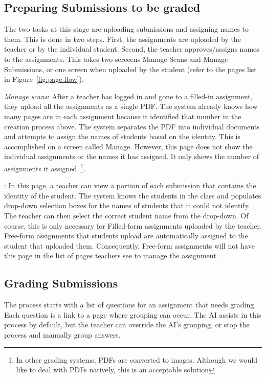 \documentclass[ms,twoside,print]{nuthesis}
\begin{document}
\subsection{Preparing Submissions to be graded}

The two tasks at this stage are uploading submissions and assigning names to them. This is done in two steps. First, the assignments are uploaded by the teacher or by the individual student. Second, the teacher approves/assigns names to the assignments. This takes two screeens Manage Scans and Manage Submissions, or one screen when uploaded by the student (refer to the pages list in Figure~\ref{fig:page-flow}).

\textit{Manage scans}: After a teacher has logged in and gone to a filled-in assignment, they upload all the assignments as a single PDF. The system already knows how many pages are in each assignment because it identified that number in the creation process above. The system separates the PDF into individual documents and attempts to assign the names of students based on the identity. This is accomplished on a screen called Manage. However, this page does not show the individual assignments or the names it has assigned. It only shows the number of assignments it assigned~\footnote{\scriptsize{In other grading systems, PDFs are converted to images. Although we would like to deal with PDFs natively, this is an acceptable solution}}. 

: In this page, a teacher can view a portion of each submission that contains the identity of the student. The system knows the students in the class and populates drop-down selection boxes for the names of students that it could not identify. The teacher can then select the correct student name from the drop-down. Of course, this is only necessary for Filled-form assignments uploaded by the teacher. Free-form assignments that students upload are automatically assigned to the student that uploaded them. Consequently, Free-form assignments will not have this page in the list of pages teachers see to manage the assignment.  

\subsection{Grading Submissions}

The process starts with a list of questions for an assignment that needs grading. Each question is a link to a page where grouping can occur. The AI assists in this process by default, but the teacher can override the AI's grouping, or stop the process and manually group answers. 
\end{document}
